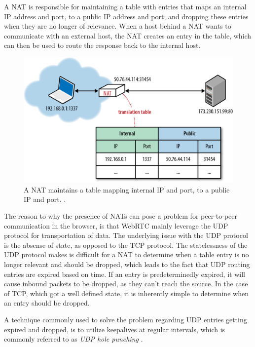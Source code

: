 A NAT is responsible for maintaining a table with entries that maps an internal IP address and port, to a public IP address and port; and dropping these entries when they are no longer of relevance. When a host behind a NAT wants to communicate with an external host, the NAT creates an entry in the table, which can then be used to route the response back to the internal host.

\begin{figure}[htp]
\centering
\includegraphics[width=\textwidth,height=0.2\paperheight,keepaspectratio
]{figures/nat}
\caption{A NAT maintains a table mapping internal IP and port, to a public IP and port. \cite{NATIllustration:Online}.}
\label{fig:NAT}
\end{figure}

The reason to why the presence of NATs can pose a problem for peer-to-peer communication in the browser, is that WebRTC mainly leverage the UDP protocol for transportation of data. The underlying issue with the UDP protocol is the absense of state, as opposed to the TCP protocol. The statelessness of the UDP protocol makes is difficult for a NAT to determine when a table entry is no longer relevant and should be dropped, which leads to the fact that UDP routing entries are expired based on time. If an entry is predeterminedly expired, it will cause inbound packets to be dropped, as they can’t reach the source. In the case of TCP, which got a well defined state, it is inherently simple to determine when an entry should be dropped.

A technique commonly used to solve the problem regarding UDP entries getting expired and dropped, is to utilize keepalives at regular intervals, which is commonly referred to as \emph{UDP hole punching} \cite{UDPHolePunching:Online}.

